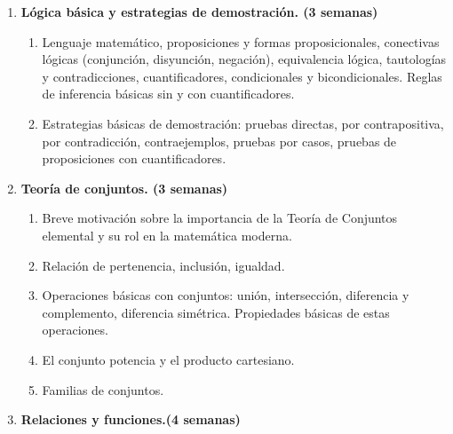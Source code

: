 \begin{refsection}
\begin{enumerate}

\item \textbf{Lógica básica y estrategias de demostración. (3 semanas)}

\begin{enumerate}
    \item Lenguaje matemático, proposiciones y formas proposicionales, conectivas lógicas (conjunción, disyunción, negación), equivalencia lógica, tautologías y contradicciones, cuantificadores, condicionales y bicondicionales. Reglas de inferencia básicas sin y con cuantificadores.
    \item Estrategias básicas de demostración: pruebas directas, por contrapositiva, por contradicción, contraejemplos, pruebas por casos, pruebas de proposiciones con cuantificadores.
\end{enumerate}

\item \textbf{Teoría de conjuntos. (3 semanas)}

\begin{enumerate}
    \item Breve motivación sobre la importancia de la Teoría de Conjuntos elemental y su rol en la matemática moderna.
    \item Relación de pertenencia, inclusión, igualdad. 
    \item Operaciones básicas con conjuntos: unión, intersección,
    diferencia y complemento, diferencia simétrica. Propiedades básicas de estas operaciones.
    \item El conjunto potencia y el producto cartesiano.
    \item Familias de conjuntos.
\end{enumerate}


\item \textbf{Relaciones y funciones.(4 semanas)}


\end{enumerate}
\end{refsection}
